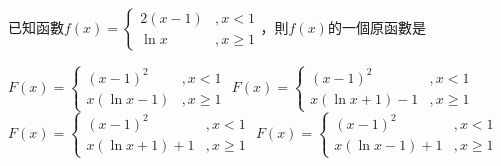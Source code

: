 \documentclass[12pt, addpoints]{exam}
\def \d{\mathrm{d}}
\begin{document}
\begin{questions}

\newpage %

\question[1]
已知函數$f(x)=\begin{cases}
    2(x-1) &,x<1\\
    \ln x &, x\geq 1
\end{cases}$，則$f(x)$的一個原函數是
\begin{choices}
    \choice $\displaystyle F(x)=\begin{cases}
        (x-1)^2 &,x<1\\
        x(\ln x -1) &, x\geq 1
    \end{cases}$
    \choice $\displaystyle F(x)=\begin{cases}
        (x-1)^2 &,x<1\\
        x(\ln x +1)-1 &, x\geq 1
    \end{cases}$
    \choice $\displaystyle F(x)=\begin{cases}
        (x-1)^2 &,x<1\\
        x(\ln x +1)+1 &, x\geq 1
    \end{cases}$
    \choice $\displaystyle F(x)=\begin{cases}
        (x-1)^2 &,x<1\\
        x(\ln x -1)+1 &, x\geq 1
    \end{cases}$
\end{choices}


\end{questions}
\end{document}
